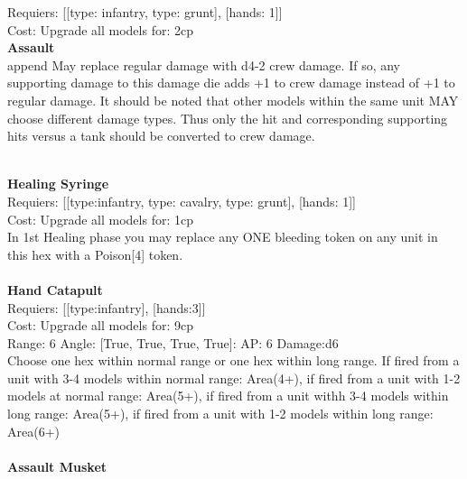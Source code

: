 Requiers: [[type: infantry, type: grunt], [hands: 1]] \\
Cost: Upgrade all models for: 2cp \\




{\bf Assault} \ \\

append May replace regular damage with d4-2 crew damage. If so, any supporting damage to this damage die adds +1 to crew damage instead of +1 to regular damage. It should be noted that other models within the same unit MAY choose different damage types. Thus only the hit and corresponding supporting hits versus a tank should be converted to crew damage.


\ \\
{\bf Healing Syringe } \\

Requiers: [[type:infantry, type: cavalry, type: grunt], [hands: 1]] \\
Cost: Upgrade all models for: 1cp \\
In 1st Healing phase you may replace any ONE bleeding token on any unit in this hex with a Poison[4] token.\\ 









\ \\
{\bf Hand Catapult } \\

Requiers: [[type:infantry], [hands:3]] \\
Cost: Upgrade all models for: 9cp \\


Range: 6  Angle: [True, True, True, True]: AP: 6 Damage:d6 \\
Choose one hex within normal range or one hex within long range. If fired from a unit with 3-4 models within normal range: Area(4+), if fired from a unit with 1-2 models at normal range: Area(5+), if fired from a unit withh 3-4 models within long range: Area(5+), if fired from a unit with 1-2 models within long range: Area(6+)\\ 








\ \\
{\bf Assault Musket } \\

